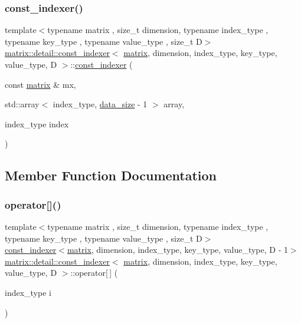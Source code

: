 \subsubsection{\texorpdfstring{const\+\_\+indexer()}{const\_indexer()}}
{\footnotesize\ttfamily template$<$typename matrix , size\+\_\+t dimension, typename index\+\_\+type , typename key\+\_\+type , typename value\+\_\+type , size\+\_\+t D$>$ \\
\hyperlink{structmatrix_1_1detail_1_1const__indexer}{matrix\+::detail\+::const\+\_\+indexer}$<$ \hyperlink{structmatrix_1_1matrix}{matrix}, dimension, index\+\_\+type, key\+\_\+type, value\+\_\+type, D $>$\+::\hyperlink{structmatrix_1_1detail_1_1const__indexer}{const\+\_\+indexer} (\begin{DoxyParamCaption}\item[{const \hyperlink{structmatrix_1_1matrix}{matrix} \&}]{mx,  }\item[{std\+::array$<$ index\+\_\+type, \hyperlink{structmatrix_1_1detail_1_1const__indexer_aaed44635b3a2322c6fc204cbd68281fb}{data\+\_\+size} -\/ 1 $>$}]{array,  }\item[{index\+\_\+type}]{index }\end{DoxyParamCaption})\hspace{0.3cm}{\ttfamily [inline]}}



\subsection{Member Function Documentation}
\mbox{\label{structmatrix_1_1detail_1_1const__indexer_aa277df84f820cefa86031447cd4c7132}} 
\subsubsection{\texorpdfstring{operator[]()}{operator[]()}}
{\footnotesize\ttfamily template$<$typename matrix , size\+\_\+t dimension, typename index\+\_\+type , typename key\+\_\+type , typename value\+\_\+type , size\+\_\+t D$>$ \\
\hyperlink{structmatrix_1_1detail_1_1const__indexer}{const\+\_\+indexer}$<$\hyperlink{structmatrix_1_1matrix}{matrix}, dimension, index\+\_\+type, key\+\_\+type, value\+\_\+type, D -\/ 1$>$ \hyperlink{structmatrix_1_1detail_1_1const__indexer}{matrix\+::detail\+::const\+\_\+indexer}$<$ \hyperlink{structmatrix_1_1matrix}{matrix}, dimension, index\+\_\+type, key\+\_\+type, value\+\_\+type, D $>$\+::operator\mbox{[}$\,$\mbox{]} (\begin{DoxyParamCaption}\item[{index\+\_\+type}]{i }\end{DoxyParamCaption})\hspace{0.3cm}{\ttfamily [inline]}}



